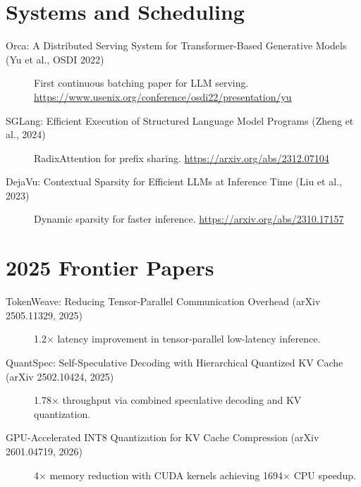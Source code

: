 \documentclass[11pt, twoside, openright]{book}
\begin{document}
\section*{Systems and Scheduling}

\begin{description}
  \item[Orca: A Distributed Serving System for Transformer-Based Generative
    Models (Yu et al., OSDI 2022)]
    First continuous batching paper for LLM serving.
    \url{https://www.usenix.org/conference/osdi22/presentation/yu}

  \item[SGLang: Efficient Execution of Structured Language Model Programs
    (Zheng et al., 2024)]
    RadixAttention for prefix sharing.
    \url{https://arxiv.org/abs/2312.07104}

  \item[DejaVu: Contextual Sparsity for Efficient LLMs at Inference Time
    (Liu et al., 2023)]
    Dynamic sparsity for faster inference.
    \url{https://arxiv.org/abs/2310.17157}
\end{description}

\section*{2025 Frontier Papers}

\begin{description}
  \item[TokenWeave: Reducing Tensor-Parallel Communication Overhead
    (arXiv 2505.11329, 2025)]
    1.2$\times$ latency improvement in tensor-parallel low-latency inference.

  \item[QuantSpec: Self-Speculative Decoding with Hierarchical Quantized KV
    Cache (arXiv 2502.10424, 2025)]
    1.78$\times$ throughput via combined speculative decoding and KV quantization.

  \item[GPU-Accelerated INT8 Quantization for KV Cache Compression
    (arXiv 2601.04719, 2026)]
    4$\times$ memory reduction with CUDA kernels achieving 1694$\times$ CPU speedup.
\end{description}

\printindex
\end{document}
